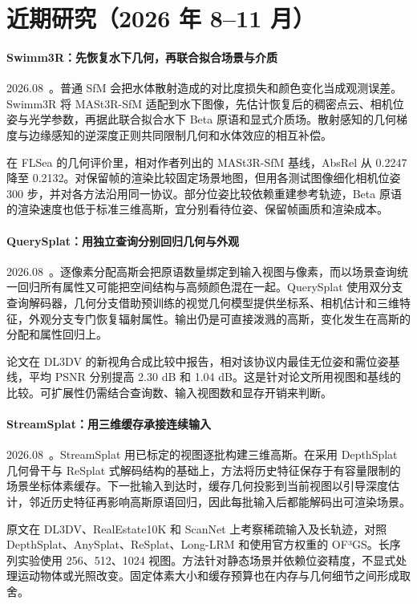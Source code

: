 \section{近期研究（2026 年 8--11 月）}
\paragraph{Swimm3R：先恢复水下几何，再联合拟合场景与介质}
2026.08~\cite{2608_00950}。普通 SfM 会把水体散射造成的对比度损失和颜色变化当成观测误差。Swimm3R 将 MASt3R-SfM 适配到水下图像，先估计恢复后的稠密点云、相机位姿与光学参数，再据此联合拟合水下 Beta 原语和显式介质场。散射感知的几何梯度与边缘感知的逆深度正则共同限制几何和水体效应的相互补偿。

在 FLSea 的几何评价里，相对作者列出的 MASt3R-SfM 基线，AbsRel 从 0.2247 降至 0.2132。对保留帧的渲染比较固定场景地图，但用各测试图像细化相机位姿 300 步，并对各方法沿用同一协议。部分位姿比较依赖重建参考轨迹，Beta 原语的渲染速度也低于标准三维高斯，宜分别看待位姿、保留帧画质和渲染成本。

\paragraph{QuerySplat：用独立查询分别回归几何与外观}
2026.08~\cite{2608_01186}。逐像素分配高斯会把原语数量绑定到输入视图与像素，而以场景查询统一回归所有属性又可能把空间结构与高频颜色混在一起。QuerySplat 使用双分支查询解码器，几何分支借助预训练的视觉几何模型提供坐标系、相机估计和三维特征，外观分支专门恢复辐射属性。输出仍是可直接泼溅的高斯，变化发生在高斯的分配和属性回归上。

论文在 DL3DV 的新视角合成比较中报告，相对该协议内最佳无位姿和需位姿基线，平均 PSNR 分别提高 2.30 dB 和 1.04 dB。这是针对论文所用视图和基线的比较。可扩展性仍需结合查询数、输入视图数和显存开销来判断。

\paragraph{StreamSplat：用三维缓存承接连续输入}
2026.08~\cite{2608_01659}。StreamSplat 用已标定的视图逐批构建三维高斯。在采用 DepthSplat 几何骨干与 ReSplat 式解码结构的基础上，方法将历史特征保存于有容量限制的场景坐标体素缓存。下一批输入到达时，缓存几何投影到当前视图以引导深度估计，邻近历史特征再影响高斯原语回归，因此每批输入后都能解码出可渲染场景。

原文在 DL3DV、RealEstate10K 和 ScanNet 上考察稀疏输入及长轨迹，对照 DepthSplat、AnySplat、ReSplat、Long-LRM 和使用官方权重的 OF³GS。长序列实验使用 256、512、1024 视图。方法针对静态场景并依赖位姿精度，不显式处理运动物体或光照改变。固定体素大小和缓存预算也在内存与几何细节之间形成取舍。

